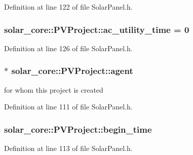 Definition at line 122 of file Solar\+Panel.\+h.

\hypertarget{classsolar__core_1_1_p_v_project_a7a44008469a8db9a47038e2945a5d723}{}
\subsubsection[{ac\+\_\+utility\+\_\+time}]{ solar\+\_\+core\+::\+P\+V\+Project\+::ac\+\_\+utility\+\_\+time = 0}\label{classsolar__core_1_1_p_v_project_a7a44008469a8db9a47038e2945a5d723}


Definition at line 126 of file Solar\+Panel.\+h.

\hypertarget{classsolar__core_1_1_p_v_project_a20e8115154979d2f856f1acceb6bb2b1}{}
\subsubsection[{agent}]{$\ast$ solar\+\_\+core\+::\+P\+V\+Project\+::agent}\label{classsolar__core_1_1_p_v_project_a20e8115154979d2f856f1acceb6bb2b1}
for whom this project is created 

Definition at line 111 of file Solar\+Panel.\+h.

\hypertarget{classsolar__core_1_1_p_v_project_a5b8869c2a2580e5183a7796580074555}{}
\subsubsection[{begin\+\_\+time}]{ solar\+\_\+core\+::\+P\+V\+Project\+::begin\+\_\+time}\label{classsolar__core_1_1_p_v_project_a5b8869c2a2580e5183a7796580074555}


Definition at line 113 of file Solar\+Panel.\+h.

\hypertarget{classsolar__core_1_1_p_v_project_a0e3e8228c8129ccd07e44503ef8577a8}{}
